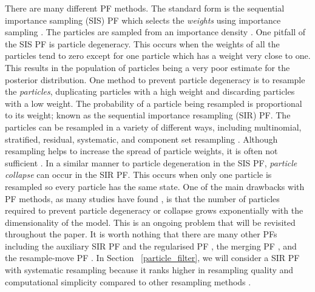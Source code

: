 There are many different PF methods. The standard form is the sequential importance sampling (SIS) PF which selects the \emph{weights} using importance sampling \citep{bergman_recursive_1999, doucet_sequential_2000}. The particles are sampled from an importance density \citep{uosaki_nonlinear_2003}. One pitfall of the SIS PF is particle degeneracy. This occurs when the weights of all the particles tend to zero except for one particle which has a weight very close to one. This results in the population of particles being a very poor estimate for the posterior distribution.  One method to prevent particle degeneracy is to resample the \emph{particles}, duplicating particles with a high weight and discarding particles with a low weight. The probability of a particle being resampled is proportional to its weight; known as the sequential importance resampling (SIR) PF. The particles can be resampled in a variety of different ways, including multinomial, stratified, residual, systematic, and component set resampling \citep{liu_sequential_1998, douc_comparison_2005, wang_data_2015}. Although resampling helps to increase the spread of particle weights, it is often not sufficient \citep{carrassi_data_2018}. In a similar manner to particle degeneration in the SIS PF, \textit{particle collapse} can occur in the SIR PF. This occurs when only one particle is resampled so every particle has the same state. One of the main drawbacks with PF methods, as many studies have found \citep[e.g.][]{snyder_obstacles_2008, carrassi_data_2018}, is that the number of particles required to prevent particle degeneracy or collapse grows exponentially with the dimensionality of the model. This is an ongoing problem that will be revisited throughout the paper. It is worth nothing that there are many other PFs including the auxiliary SIR PF and the regularised PF \citep{arulampalam_tutorial_2002}, the merging PF \citep{nakano_merging_2007}, and the resample-move PF \citep{gilks_following_2001}. In Section ~\ref{particle_filter}, we will consider a SIR PF with systematic resampling because it ranks higher in resampling quality and computational simplicity compared to other resampling methods \citep{hol_resampling_2006, douc_comparison_2005}.
